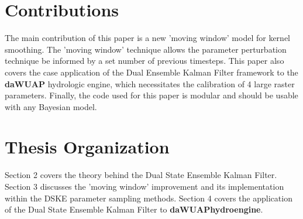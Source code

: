 \section{Contributions}

The main contribution of this paper is a new 'moving window' model for kernel smoothing. The 'moving window' technique allows the parameter perturbation technique be informed by a set number of previous timesteps. This paper also covers the case application of the Dual Ensemble Kalman Filter framework to the \textbf{daWUAP} hydrologic engine, which necessitates the calibration of 4 large raster parameters. Finally, the code used for this paper is modular and should be usable with any Bayesian model.

\section{Thesis Organization}

Section 2 covers the theory behind the Dual State Ensemble Kalman Filter. Section 3 discusses the 'moving window' improvement and its implementation within the DSKE parameter sampling methods. Section 4 covers the application of the Dual State Ensemble Kalman Filter to \textbf{daWUAPhydroengine}.


